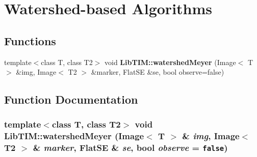 \section{Watershed-based Algorithms}
\label{group__watershed}
\subsection*{Functions}
\begin{CompactItemize}
\item 
template$<$class T, class T2$>$ void {\bf Lib\-TIM::watershed\-Meyer} (Image$<$ T $>$ \&img, Image$<$ T2 $>$ \&marker, Flat\-SE \&se, bool observe=false)
\end{CompactItemize}


\subsection{Function Documentation}
\subsubsection{\setlength{\rightskip}{0pt plus 5cm}template$<$class T, class T2$>$ void Lib\-TIM::watershed\-Meyer (Image$<$ T $>$ \& {\em img}, Image$<$ T2 $>$ \& {\em marker}, Flat\-SE \& {\em se}, bool {\em observe} = {\tt false})}\label{group__watershed_ga0}


